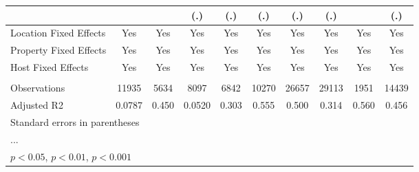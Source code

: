 \begin{table}[htbp]
\begin{tabular}{l*{9}{c}}
                    &                     &                     &         (.)         &         (.)         &         (.)         &         (.)         &         (.)         &                     &         (.)         \\
\hline
Location Fixed Effects&         Yes         &         Yes         &         Yes         &         Yes         &         Yes         &         Yes         &         Yes         &         Yes         &         Yes         \\
Property Fixed Effects&         Yes         &         Yes         &         Yes         &         Yes         &         Yes         &         Yes         &         Yes         &         Yes         &         Yes         \\
Host Fixed Effects  &         Yes         &         Yes         &         Yes         &         Yes         &         Yes         &         Yes         &         Yes         &         Yes         &         Yes         \\
\hline \vspace{-1.25em}&                     &                     &                     &                     &                     &                     &                     &                     &                     \\
Observations        &       11935         &        5634         &        8097         &        6842         &       10270         &       26657         &       29113         &        1951         &       14439         \\
Adjusted R2         &      0.0787         &       0.450         &      0.0520         &       0.303         &       0.555         &       0.500         &       0.314         &       0.560         &       0.456         \\
\hline\hline
\multicolumn{10}{l}{\footnotesize Standard errors in parentheses}\\
\multicolumn{10}{l}{\footnotesize ...}\\
\multicolumn{10}{l}{\footnotesize \sym{*} \(p<0.05\), \sym{**} \(p<0.01\), \sym{***} \(p<0.001\)}\\
\end{tabular}
\end{table}
